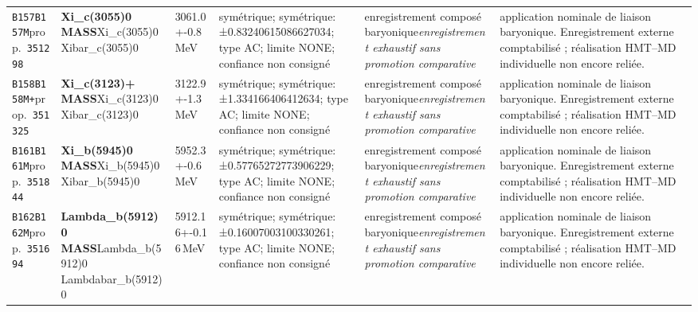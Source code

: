 \begin{landscape}
\begin{longtable}{L{1.85cm}L{4.45cm}L{2.35cm}L{4.05cm}L{3.35cm}L{7.15cm}}
\texttt{B157}\newline \texttt{B157M}\newline prop.\ \texttt{351298} & \textbf{Xi\_\allowbreak{}c(3055)0 MASS}\newline Xi\_\allowbreak{}c(3055)0 \textbar{}\allowbreak{} Xibar\_\allowbreak{}c(3055)0 & 3061.0+-0.8\,MeV & symétrique; symétrique: ±0.83240615086627034; type AC; limite NONE; confiance non consigné & enregistrement composé baryonique\newline \emph{enregistrement exhaustif sans promotion comparative} & application nominale de liaison baryonique. Enregistrement externe comptabilisé ; réalisation HMT--MD individuelle non encore reliée. \\
\texttt{B158}\newline \texttt{B158M+}\newline prop.\ \texttt{351325} & \textbf{Xi\_\allowbreak{}c(3123)+ MASS}\newline Xi\_\allowbreak{}c(3123)0 \textbar{}\allowbreak{} Xibar\_\allowbreak{}c(3123)0 & 3122.9+-1.3\,MeV & symétrique; symétrique: ±1.334166406412634; type AC; limite NONE; confiance non consigné & enregistrement composé baryonique\newline \emph{enregistrement exhaustif sans promotion comparative} & application nominale de liaison baryonique. Enregistrement externe comptabilisé ; réalisation HMT--MD individuelle non encore reliée. \\
\texttt{B161}\newline \texttt{B161M}\newline prop.\ \texttt{351844} & \textbf{Xi\_\allowbreak{}b(5945)0 MASS}\newline Xi\_\allowbreak{}b(5945)0 \textbar{}\allowbreak{} Xibar\_\allowbreak{}b(5945)0 & 5952.3+-0.6\,MeV & symétrique; symétrique: ±0.57765272773906229; type AC; limite NONE; confiance non consigné & enregistrement composé baryonique\newline \emph{enregistrement exhaustif sans promotion comparative} & application nominale de liaison baryonique. Enregistrement externe comptabilisé ; réalisation HMT--MD individuelle non encore reliée. \\
\texttt{B162}\newline \texttt{B162M}\newline prop.\ \texttt{351694} & \textbf{Lambda\_\allowbreak{}b(5912)0 MASS}\newline Lambda\_\allowbreak{}b(5912)0 \textbar{}\allowbreak{} Lambdabar\_\allowbreak{}b(5912)0 & 5912.16+-0.16\,MeV & symétrique; symétrique: ±0.16007003100330261; type AC; limite NONE; confiance non consigné & enregistrement composé baryonique\newline \emph{enregistrement exhaustif sans promotion comparative} & application nominale de liaison baryonique. Enregistrement externe comptabilisé ; réalisation HMT--MD individuelle non encore reliée. \\

\end{longtable}
\end{landscape}
